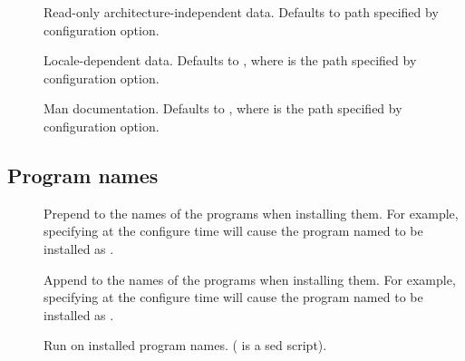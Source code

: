 \documentclass[letterpaper,10pt,english]{sphinxmanual}
\begin{document}
\begin{description}
\item[{\sphinxstylestrong{-}}] \leavevmode
Read-only architecture-independent data.  Defaults to path
specified by \sphinxstylestrong{-} configuration option.

\item[{\sphinxstylestrong{-}}] \leavevmode
Locale-dependent data.  Defaults to , where
 is the path specified by \sphinxstylestrong{-}
configuration option.

\item[{\sphinxstylestrong{-}}] \leavevmode
Man documentation.  Defaults to , where
 is the path specified by \sphinxstylestrong{-}
configuration option.

\end{description}


\subsection{Program names}
\label{\detokenize{build/options2configure:program-names}}\begin{description}
\item[{\sphinxstylestrong{-}}] \leavevmode
Prepend  to the names of the programs when installing
them. For example, specifying  at the
configure time will cause the program named  to be
installed as .

\item[{\sphinxstylestrong{-}}] \leavevmode
Append  to the names of the programs when installing them.
For example, specifying  at the configure
time will cause the program named  to be installed as
.

\item[{\sphinxstylestrong{-}}] \leavevmode
Run  on installed program names. ( is a
sed script).

\end{description}
\end{document}
